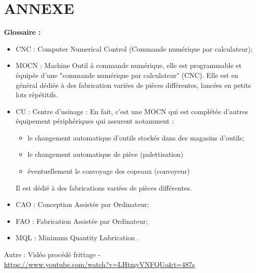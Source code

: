 \documentclass[12pt]{article}
\begin{document}
\section{ANNEXE}
\begin{tcolorbox}[colback=blue!5!white,colframe=orange!75!black]
\begin{center}
    \textbf{Glossaire :}
\end{center}
\begin{itemize}
    \item CNC : Computer Numerical Control (Commande numérique par calculateur);
    \item MOCN : Machine Outil à commande numérique, elle est programmable et équipée d'une "commande numérique par calculateur" (CNC). Elle est en général dédiée à des fabrication variées de pièces différentes, lancées en petits lots répétitifs.
    \item CU : Centre d'usinage : En fait, c'est une MOCN qui est complétée d'autres équipement périphériques qui assurent notamment : \begin{itemize}
        \item le changement automatique d'outils stockés dans des magasins d'outils;
        \item le changement automatique de pièce (palettisation)
        \item éventuellement le convoyage des copeaux (convoyeur)
    \end{itemize}
    Il est dédié à des fabrications variées de pièces différentes.
    \item CAO : Conception Assistée par Ordinateur;
    \item FAO : Fabrication Assistée par Ordinateur;
    \item MQL : Minimum Quantity Lubrication .
\end{itemize}
\end{tcolorbox}

Autre :
Vidéo procédé frittage - \\
\url{https://www.youtube.com/watch?v=LHtmyVNFQUo&t=487s} 
\end{document}
